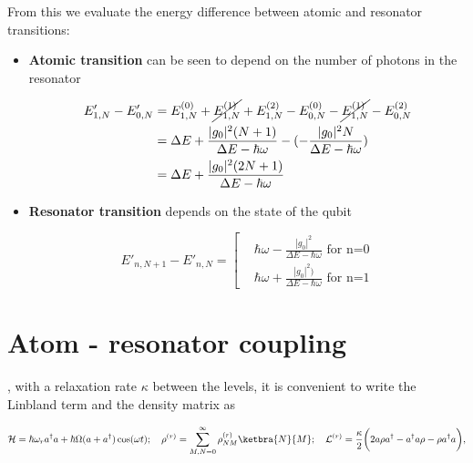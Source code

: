 \noindent From this we evaluate the energy difference between atomic and resonator transitions:

\begin{itemize}
\item \textbf{Atomic transition} can be seen to depend on the number of photons in the resonator
	
	\begin{equation}\label{secAtom}\begin{aligned}
            E'_{1,N}-E'_{0,N} & = E_{1,N}^{(0)} + \cancel{E_{1,N}^{(1)}} + E_{1,N}^{(2)} - E_{0,N}^{(0)} - \cancel{E_{1,N}^{(1)}}
            - E_{0,N}^{(2)} \\& = \Delta E + \frac{|g_0|^2(N+1)}{\Delta E - \hbar\omega} - (-\frac{|g_0|^2N}{\Delta E -
              \hbar\omega})\\& = {\Delta E+\frac{|g_0|^2(2N+1)}{\Delta E - \hbar\omega}}
          \end{aligned}
	\end{equation}
      \item \textbf{Resonator transition} depends on the state of the qubit
	
	\begin{equation}\label{secRes}
          E'_{n,N+1}-E'_{n,N} = \left[\begin{aligned}
              & \hbar\omega  -\frac{|g_0|^2}{\Delta E -  \hbar\omega} \text{ for n=0}
              \\&  \hbar\omega + {\frac{|g_0|^2)}{\Delta E -  \hbar\omega}}\text{ for n=1}
            \end{aligned}\right.
	\end{equation}
      \end{itemize}

      \newpage

      \section{Atom - resonator coupling}
      \noindent {}, with a relaxation rate $ \kappa $ between the
      levels, it is convenient to write the Linbland term and the density matrix as

\begin{equation}\label{ar2}
  \mathcal{H} = \hbar\omega_ra^{\dagger}a+\hbar\Omega(a+a^{\dagger})\cos(\omega t);\quad\rho^{(r)} = \sum_{M,N=0}^{\infty}\rho_{NM}^{(r)}\ketbra{N}{M};\quad \mathcal{L}^{(r)} = \frac{\kappa}{2}\bigg(2a\rho a^{\dagger}-a^{\dagger}a\rho-\rho a^{\dagger}a\bigg),
\end{equation}

